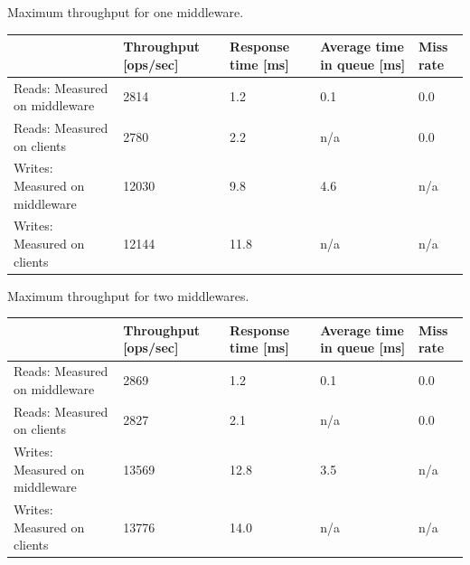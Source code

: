 \documentclass[11pt,a4paper]{article}
\begin{document}

\begin{center}
	{Maximum throughput for one middleware.}
	\begin{tabular}{|l|p{2cm}|p{2cm}|p{2cm}|p{2cm}|}
		\hline                                & Throughput [ops/sec] & Response time [ms] & Average time in queue [ms] & Miss rate \\ 
		\hline Reads: Measured on middleware  &                 2814 &                1.2 &                        0.1 & 0.0       \\ 
		\hline Reads: Measured on clients     &                 2780 &                2.2 &                        n/a & 0.0       \\ 
		\hline Writes: Measured on middleware &                12030 &                9.8 &                        4.6 & n/a       \\ 
		\hline Writes: Measured on clients    &                12144 &                11.8 &                       n/a & n/a       \\ 
		\hline 
	\end{tabular}
\end{center}

\begin{center}
	{Maximum throughput for two middlewares.}
	\begin{tabular}{|l|p{2cm}|p{2cm}|p{2cm}|p{2cm}|}
		\hline                                & Throughput [ops/sec] & Response time [ms] & Average time in queue [ms] & Miss rate \\ 
		\hline Reads: Measured on middleware  &                 2869 &                1.2 &                        0.1 & 0.0       \\ 
		\hline Reads: Measured on clients     &                 2827 &                2.1 &                        n/a & 0.0       \\ 
		\hline Writes: Measured on middleware &                13569 &               12.8 &                        3.5 & n/a       \\ 
		\hline Writes: Measured on clients    &                13776 &               14.0 &                        n/a & n/a       \\ 
		\hline 
	\end{tabular}
\end{center}
\end{document}

